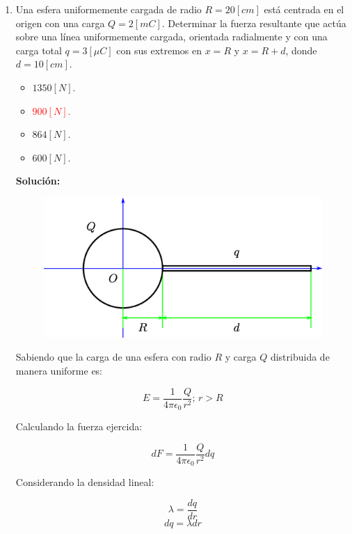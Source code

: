 \documentclass[letter,11pt]{article}
\begin{document}
\begin{enumerate}
\item Una esfera uniformemente cargada de radio $R = 20 [cm]$ está centrada en
el origen con una carga $Q = 2 [mC]$. Determinar la fuerza resultante que actúa
sobre una línea uniformemente cargada, orientada radialmente y con una carga
total $q = 3 [\mu C]$ con sus extremos en $x = R$ y $x = R + d$, donde
$d = 10 [cm]$.

\begin{itemize}
    \item $1350 [N]$.
    \item \textcolor{red}{$ 900 [N]$.}
    \item $ 864 [N]$.
    \item $ 600 [N]$.
\end{itemize}

\textbf{Solución:}

\begin{figure}[!h]
\centering
\includegraphics[scale=0.40]{resources/a3.eps}
\end{figure}

Sabiendo que la carga de una esfera con radio $R$ y carga $Q$ distribuida de
manera uniforme es:

\begin{equation*}
    E = \frac{1}{4\pi\epsilon_0}\frac{Q}{r^2};\,r > R
\end{equation*}

Calculando la fuerza ejercida:

\begin{equation*}
    dF = \frac{1}{4\pi\epsilon_0}\frac{Q}{r^2} dq
\end{equation*}

Considerando la densidad lineal:

\begin{equation*}
    \lambda = \frac{dq}{dr}
\end{equation*}
\begin{equation*}
    dq = \lambda dr
\end{equation*}


\end{enumerate}
\end{document}
